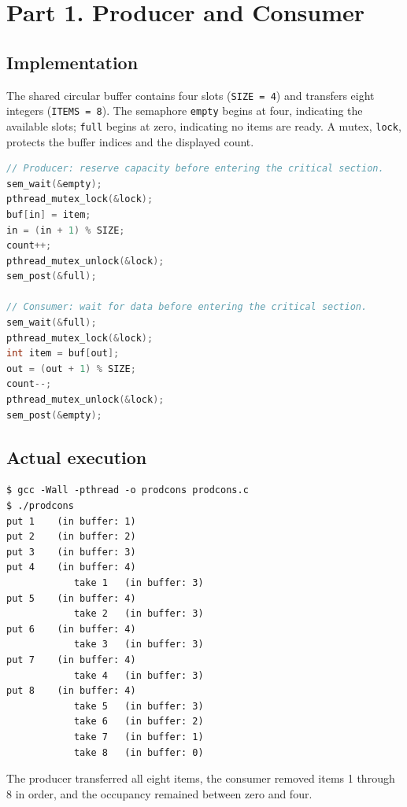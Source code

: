 \documentclass[12pt,a4paper]{article}
\begin{document}
\section{Part 1. Producer and Consumer}
\subsection{Implementation}
The shared circular buffer contains four slots (\texttt{SIZE = 4}) and transfers eight integers (\texttt{ITEMS = 8}). The semaphore \texttt{empty} begins at four, indicating the available slots; \texttt{full} begins at zero, indicating no items are ready. A mutex, \texttt{lock}, protects the buffer indices and the displayed count.
\begin{lstlisting}[language=C]
// Producer: reserve capacity before entering the critical section.
sem_wait(&empty);
pthread_mutex_lock(&lock);
buf[in] = item;
in = (in + 1) % SIZE;
count++;
pthread_mutex_unlock(&lock);
sem_post(&full);

// Consumer: wait for data before entering the critical section.
sem_wait(&full);
pthread_mutex_lock(&lock);
int item = buf[out];
out = (out + 1) % SIZE;
count--;
pthread_mutex_unlock(&lock);
sem_post(&empty);
\end{lstlisting}
\subsection{Actual execution}
\begin{lstlisting}
$ gcc -Wall -pthread -o prodcons prodcons.c
$ ./prodcons
put 1    (in buffer: 1)
put 2    (in buffer: 2)
put 3    (in buffer: 3)
put 4    (in buffer: 4)
            take 1   (in buffer: 3)
put 5    (in buffer: 4)
            take 2   (in buffer: 3)
put 6    (in buffer: 4)
            take 3   (in buffer: 3)
put 7    (in buffer: 4)
            take 4   (in buffer: 3)
put 8    (in buffer: 4)
            take 5   (in buffer: 3)
            take 6   (in buffer: 2)
            take 7   (in buffer: 1)
            take 8   (in buffer: 0)
\end{lstlisting}
The producer transferred all eight items, the consumer removed items 1 through 8 in order, and the occupancy remained between zero and four.
\end{document}
